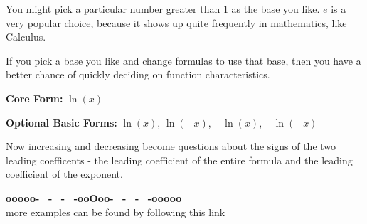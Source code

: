 \documentclass{ximera}
\begin{document}
You might pick a particular number greater than $1$ as the base you like.  $e$ is a very popular choice, because it shows up quite frequently in mathematics, like Calculus. 











If you pick a base you like and change formulas to use that base, then you have a better chance of quickly deciding on function characteristics. 



\textbf{\textcolor{blue!55!black}{Core Form:}}  $\ln(x)$ 



\textbf{\textcolor{blue!55!black}{Optional Basic Forms:}}  $\ln(x)$, $\ln(-x)$, $-\ln(x)$, $-\ln(-x)$ 


Now increasing and decreasing become questions about the signs of the two leading coefficents - the leading coefficient of the entire formula and the leading coefficient of the exponent.














\begin{onlineOnly}
\begin{center}
\textbf{\textcolor{green!50!black}{ooooo-=-=-=-ooOoo-=-=-=-ooooo}} \\

more examples can be found by following this link\\ 

\end{center}
\end{onlineOnly}
\end{document}
